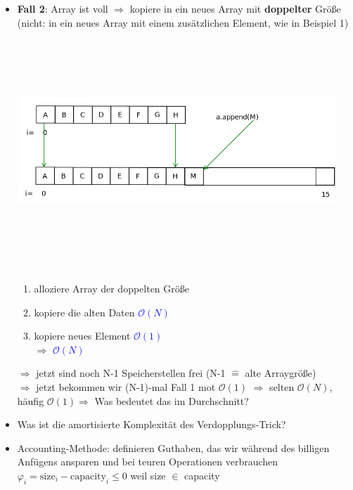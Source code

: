 \documentclass[11pt, fleqn]{scrreprt}
\begin{document}
\begin{itemize}
	\item \textbf{Fall 2}: Array ist voll $\Rightarrow$ kopiere in ein neues Array mit \textbf{doppelter} Größe \\
	(nicht: in ein neues Array mit einem zusätzlichen Element, wie in Beispiel 1) \\
	\includegraphics[width=12cm,height=9cm,keepaspectratio]{./Pictures/dynArrDopp.png}
	\begin{enumerate}
		\item alloziere Array der doppelten Größe
		\item kopiere die alten Daten \hspace*{3cm} \textcolor{blue}{$\mathcal{O}(N)$}
		\item kopiere neues Element  \hspace*{3.1cm} \textcolor{blue}{$\mathcal{O}(1)$} \\
		$\Rightarrow$ \textcolor{blue}{$\mathcal{O}(N)$}
	\end{enumerate}
	$\Rightarrow$ jetzt sind noch N-1 Speicherstellen frei (N-1 $\widehat{=}$ alte Arraygröße) \\
	$\Rightarrow$ jetzt bekommen wir (N-1)-mal Fall 1 mot $\mathcal{O}(1)$
	$\Rightarrow$ selten $\mathcal{O}(N)$, häufig $\mathcal{O}(1)$$\Rightarrow$ Was bedeutet das im Durchschnitt?
	
	\item Was ist die amortisierte Komplexität des \glqq Verdopplungs-Trick\grqq ?
	\item Accounting-Methode: definieren \glqq Guthaben\grqq, das wir während des billigen Anfügens ansparen und bei teuren Operationen verbrauchen \\
	$\varphi_i = \text{size}_i - \text{capacity}_i \leq 0$ weil size $\in$ capacity
\end{itemize}
\end{document}
